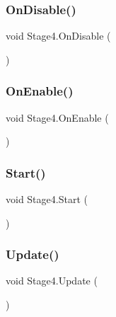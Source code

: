 \mbox{\label{class_stage4_a2746354b2a72b27e3add3f0f4c7f5160}} 
\subsubsection{\texorpdfstring{On\+Disable()}{OnDisable()}}
{\footnotesize\ttfamily void Stage4.\+On\+Disable (\begin{DoxyParamCaption}{ }\end{DoxyParamCaption})\hspace{0.3cm}{\ttfamily [private]}}

\mbox{\label{class_stage4_ace16b39395d5c08775c8e031c0e76aa2}} 
\subsubsection{\texorpdfstring{On\+Enable()}{OnEnable()}}
{\footnotesize\ttfamily void Stage4.\+On\+Enable (\begin{DoxyParamCaption}{ }\end{DoxyParamCaption})\hspace{0.3cm}{\ttfamily [private]}}

\mbox{\label{class_stage4_a24aafa249875c3bd1a1383d2eb40c79e}} 
\subsubsection{\texorpdfstring{Start()}{Start()}}
{\footnotesize\ttfamily void Stage4.\+Start (\begin{DoxyParamCaption}{ }\end{DoxyParamCaption})\hspace{0.3cm}{\ttfamily [private]}}

\mbox{\label{class_stage4_a6772bbc4255878e6c0987c8876e547b7}} 
\subsubsection{\texorpdfstring{Update()}{Update()}}
{\footnotesize\ttfamily void Stage4.\+Update (\begin{DoxyParamCaption}{ }\end{DoxyParamCaption})\hspace{0.3cm}{\ttfamily [private]}}



